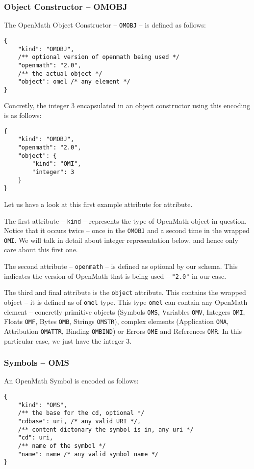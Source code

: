 \subsubsection{Object Constructor -- OMOBJ}

The OpenMath Object Constructor -- \texttt{OMOBJ} -- is defined as follows:
\begin{lstlisting}
{
    "kind": "OMOBJ",
    /** optional version of openmath being used */
    "openmath": "2.0",
    /** the actual object */
    "object": omel /* any element */
}
\end{lstlisting}
Concretly, the integer 3 encapsulated in an object constructor using this encoding is as follows:
\begin{lstlisting}
{
    "kind": "OMOBJ",
    "openmath": "2.0",
    "object": {
        "kind": "OMI", 
        "integer": 3
    }
}
\end{lstlisting}

Let us have a look at this first example attribute for attribute. 

The first attribute -- \texttt{kind} -- represents the type of OpenMath object in question. 
Notice that it occurs twice -- once in the \texttt{OMOBJ} and a second time in the wrapped \texttt{OMI}. 
We will talk in detail about integer representation below, and hence only care about this first one. 

The second attribute -- \texttt{openmath} -- is defined as optional by our schema. 
This indicates the version of OpenMath that is being used -- \lstinline{"2.0"} in our case. 

The third and final attribute is the \texttt{object} attribute. 
This contains the wrapped object -- it is defined as of \texttt{omel} type. 
This type \texttt{omel} can contain any OpenMath element -- concretly
primitive objects (Symbols \texttt{OMS}, Variables \texttt{OMV}, Integers \texttt{OMI}, Floats \texttt{OMF}, Bytes \texttt{OMB}, Strings \texttt{OMSTR}), 
complex elements (Application \texttt{OMA}, Attribution \texttt{OMATTR}, Binding \texttt{OMBIND}) or
Errors \texttt{OME} and References \texttt{OMR}. 
In this particular case, we just have the integer $3$. 

\subsubsection{Symbols -- OMS}

An OpenMath Symbol is encoded as follows:
\begin{lstlisting}
{
    "kind": "OMS",
    /** the base for the cd, optional */
    "cdbase": uri, /* any valid URI */, 
    /** content dictonary the symbol is in, any uri */
    "cd": uri,
    /** name of the symbol */
    "name": name /* any valid symbol name */
}
\end{lstlisting}

